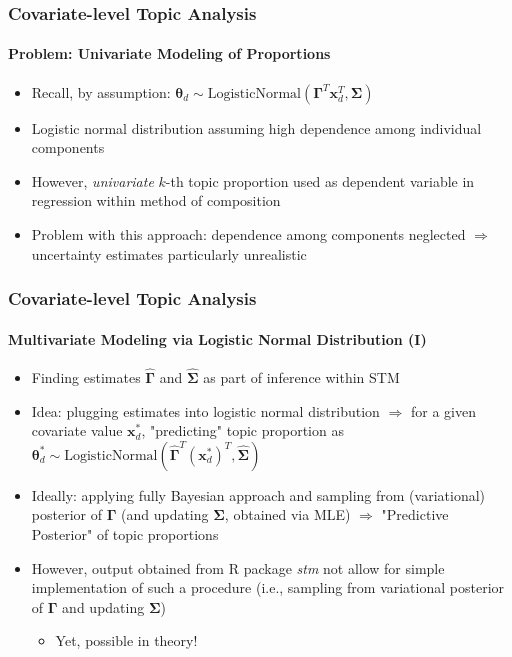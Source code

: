 \documentclass[xcolor=dvipsnames]{beamer}
\begin{document}
\begin{frame}
\frametitle{Covariate-level Topic Analysis}
\framesubtitle{Problem: Univariate Modeling of Proportions}
\begin{itemize}
\item Recall, by assumption: $\boldsymbol{\theta}_d \sim \text{LogisticNormal}(\boldsymbol{\Gamma}^T\boldsymbol{x}_d^T, \boldsymbol{\Sigma})$
\item Logistic normal distribution assuming high dependence among individual components
\item However, \textit{univariate} $k$-th topic proportion used as dependent variable in regression within method of composition
\item Problem with this approach: dependence among components neglected $\Rightarrow$ uncertainty estimates particularly unrealistic
\end{itemize}
\end{frame}

\begin{frame}
\frametitle{Covariate-level Topic Analysis}
\framesubtitle{Multivariate Modeling via Logistic Normal Distribution (I)}
\begin{itemize}
\item Finding estimates $\hat{\boldsymbol{\Gamma}}$ and $\hat{\boldsymbol{\Sigma}}$ as part of inference within STM
\item Idea: plugging estimates into logistic normal distribution $\Rightarrow$ for a given covariate value $\boldsymbol{x}^*_d$, "predicting" topic proportion as
$\boldsymbol{\theta}^*_d \sim \text{LogisticNormal}(\hat{\boldsymbol{\Gamma}}^T(\boldsymbol{x}_d^*)^T, \hat{\boldsymbol{\Sigma}})$
\item Ideally: applying fully Bayesian approach and sampling from (variational) posterior of $\boldsymbol{\Gamma}$ (and updating $\boldsymbol{\Sigma}$, obtained via MLE) $\Rightarrow$ "Predictive Posterior" of topic proportions
\item However, output obtained from R package \textit{stm} not allow for simple implementation of such a procedure (i.e., sampling from variational posterior of $\boldsymbol{\Gamma}$ and updating $\boldsymbol{\Sigma}$)
	\begin{itemize}
	\item Yet, possible in theory!
	\end{itemize}
\end{itemize}
\end{frame}
\end{document}
